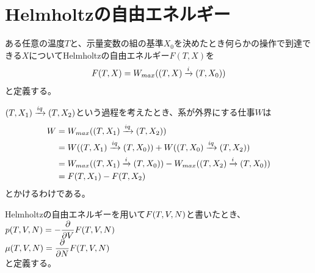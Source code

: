 \section{Helmholtzの自由エネルギー}
ある任意の温度$T$と、示量変数の組の基準$X_0$を決めたとき何らかの操作で到達できる$X$についてHelmholtzの自由エネルギー$F(T, X)$を
\begin{align}\label{helmholtz-def}
  F(T, X) = W_{max}((T,X)\xrightarrow{i}(T,X_{0}))
\end{align}
と定義する。

$(T, X_1)\xrightarrow{iq}(T, X_2)$という過程を考えたとき、系が外界にする仕事$W$は
\begin{align*}
  W &= W_{max}((T, X_1)\xrightarrow{iq}(T, X_2)) \\
  &= W((T, X_1)\xrightarrow{iq}(T,X_{0})) + W((T,X_{0})\xrightarrow{iq}(T, X_2)) \\
  &= W_{max}((T, X_1)\xrightarrow{i}(T,X_{0})) - W_{max}((T, X_2)\xrightarrow{i}(T,X_{0})) \\
  &= F(T, X_1) - F(T, X_2)
\end{align*}
とかけるわけである。

Helmholtzの自由エネルギーを用いて$F(T, V, N)$と書いたとき、\\
$\displaystyle p(T, V, N)=-\pdv{V}F(T, V, N)$\\
$\displaystyle \mu(T, V, N)=\pdv{N}F(T, V, N)$\\
と定義する。
